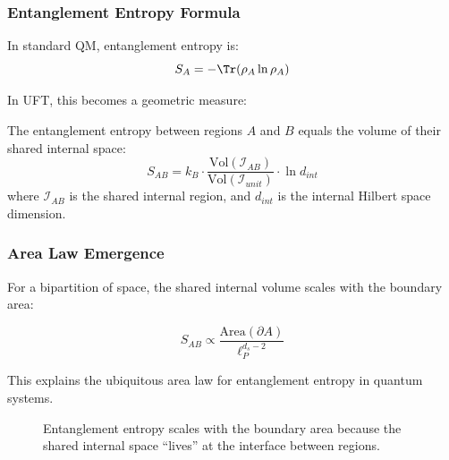 \subsubsection{Entanglement Entropy Formula}

In standard QM, entanglement entropy is:
\begin{equation}
    S_A = -\Tr(\rho_A \ln \rho_A)
\end{equation}

In UFT, this becomes a geometric measure:

\begin{theorem}
The entanglement entropy between regions $A$ and $B$ equals the volume of their shared internal space:
\begin{equation}
    S_{AB} = k_B \cdot \frac{\text{Vol}(\mathcal{I}_{AB})}{\text{Vol}(\mathcal{I}_{unit})} \cdot \ln d_{int}
\end{equation}
where $\mathcal{I}_{AB}$ is the shared internal region, and $d_{int}$ is the internal Hilbert space dimension.
\end{theorem}

\subsubsection{Area Law Emergence}

For a bipartition of space, the shared internal volume scales with the boundary area:

\begin{equation}
    S_{AB} \propto \frac{\text{Area}(\partial A)}{\ell_P^{d_s-2}}
\end{equation}

This explains the ubiquitous area law for entanglement entropy in quantum systems.

\begin{figure}[htbp]
\centering
{}
\caption{Entanglement entropy scales with the boundary area because the shared internal space ``lives'' at the interface between regions.}
\label{fig:area_law}
\end{figure}

